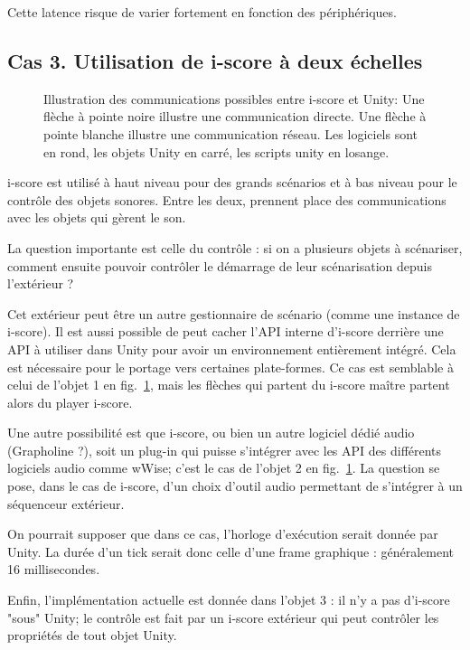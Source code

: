 \documentclass[french,12pt,a4paper]{article}
\begin{document}
Cette latence risque de varier fortement en fonction des périphériques. 

\subsection{Cas 3. Utilisation de i-score à deux échelles}
\begin{figure}
    \centering
    \scalebox{0.5}{}
    \caption{Illustration des communications possibles entre i-score et Unity:
        Une flèche à pointe noire illustre une communication directe. Une flèche à pointe blanche illustre une communication réseau. Les logiciels sont en rond, les objets Unity en carré, les scripts unity en losange.}
    \label{fig.com.iscore.unity}
\end{figure}

i-score est utilisé à haut niveau pour des grands scénarios et à bas niveau pour le contrôle des objets sonores.
Entre les deux, prennent place des communications avec les objets qui gèrent le son.

La question importante est celle du contrôle : si on a plusieurs objets à scénariser, comment 
ensuite pouvoir contrôler le démarrage de leur scénarisation depuis l'extérieur ? 

Cet extérieur peut être un autre gestionnaire de scénario (comme une instance de i-score).
Il est aussi possible de peut cacher l'API interne d'i-score derrière une API à utiliser dans Unity pour avoir un environnement entièrement intégré. 
Cela est nécessaire pour le portage vers certaines plate-formes. 
Ce cas est semblable à celui de l'objet 1 en fig.~\ref{fig.com.iscore.unity}, mais les flèches qui partent du i-score maître partent alors du player i-score.

Une autre possibilité est que i-score, ou bien un autre logiciel dédié audio (Grapholine ?), soit un plug-in qui puisse s'intégrer avec les API des différents logiciels audio comme wWise; c'est le cas de l'objet 2 en fig.~\ref{fig.com.iscore.unity}.
La question se pose, dans le cas de i-score, d'un choix d'outil audio permettant de s'intégrer à un séquenceur extérieur.

On pourrait supposer que dans ce cas, l'horloge d'exécution serait donnée par Unity. 
La durée d'un tick serait donc celle d'une frame graphique : généralement 16 millisecondes.

Enfin, l'implémentation actuelle est donnée dans l'objet 3 : il n'y a pas d'i-score "sous" Unity; le contrôle est fait par un i-score extérieur qui peut contrôler les propriétés de tout objet Unity. 
\end{document}
